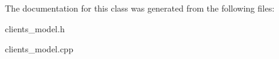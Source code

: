 The documentation for this class was generated from the following files\-:\begin{DoxyCompactItemize}
\item 
clients\-\_\-model.\-h\item 
clients\-\_\-model.\-cpp\end{DoxyCompactItemize}
